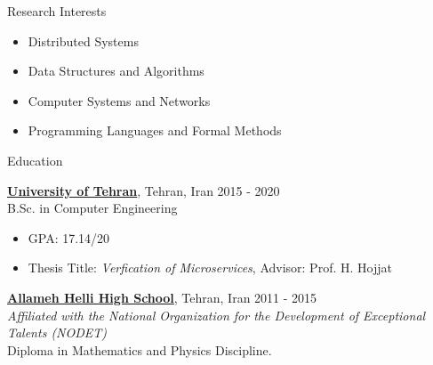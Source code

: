\documentclass{resume} %
\begin{document}
	

\begin{rSection}{Research Interests}
	\begin{multicols}{2}
		\begin{itemize}[leftmargin=0mm]
			\item Distributed Systems
			\item Data Structures and Algorithms
			\item Computer Systems and Networks
			\item Programming Languages and Formal Methods
		\end{itemize}
	\end{multicols}
\end{rSection}


\begin{rSection}{Education}
	
	{\bf \href{http://ut.ac.ir/en}{University of Tehran}}, Tehran, Iran \hfill 2015 - 2020 
	\\B.Sc. in Computer Engineering
	
	\begin{itemize}
		\item GPA: 17.14/20 
        \item Thesis Title: \textit{Verfication of Microservices}, Advisor: Prof. H. Hojjat
	\end{itemize}
	
	{\bf \href{http://www.helli.ir/}{Allameh Helli High School}}, Tehran, Iran \hfill 2011 - 2015
	\\\textit{\scriptsize Affiliated with the National Organization for the Development of Exceptional Talents (NODET)}
	\\Diploma in Mathematics and Physics Discipline.
	
\end{rSection}
\end{document}
